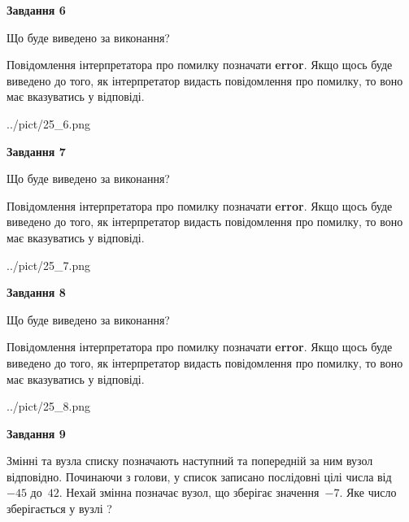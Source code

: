 \documentclass[12pt, ukrainian]{article}
\begin{document}
{\begin {large}
{\begin {center}\textbf{Завдання 6}\end {center}}\par
Що буде виведено за виконання?

Повідомлення інтерпретатора про помилку позначати \textbf{error}.
Якщо щось буде виведено до того, як інтерпретатор видасть повідомлення про помилку, 
то воно має вказуватись у відповіді. \par


\begin{center}
	{../pict/25_6.png}
\end{center}
\newpage

{\begin {center}\textbf{Завдання 7}\end {center}}\par
Що буде виведено за виконання?

Повідомлення інтерпретатора про помилку позначати \textbf{error}.
Якщо щось буде виведено до того, як інтерпретатор видасть повідомлення про помилку, 
то воно має вказуватись у відповіді. \par


\begin{center}
	{../pict/25_7.png}
\end{center}
\newpage

{\begin {center}\textbf{Завдання 8}\end {center}}\par
Що буде виведено за виконання?

Повідомлення інтерпретатора про помилку позначати \textbf{error}.
Якщо щось буде виведено до того, як інтерпретатор видасть повідомлення про помилку, 
то воно має вказуватись у відповіді. \par


\begin{center}
	{../pict/25_8.png}
\end{center}
\newpage

{\begin {center}\textbf{Завдання 9}\end {center}}\par
Змінні  та  вузла списку позначають наступний та попередній за ним вузол відповідно. Починаючи з голови, у список записано послідовні цілі числа від~$-45$ до~$42$. Нехай змінна  позначає вузол, що зберігає значення~$-7$.
Яке число зберігається у вузлі  ?\par
\newpage


\end{large}}
\end{document}
